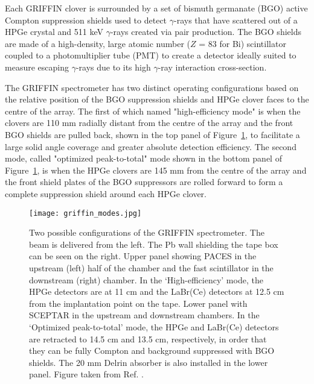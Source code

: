 \documentclass[cnatzke_thesis_proposal.tex]{subfiles}
\begin{document}
Each GRIFFIN clover is surrounded by a set of bismuth germanate (BGO) active Compton suppression shields used to detect $\gamma$-rays that have scattered out of a HPGe crystal and 511 keV $\gamma$-rays created via pair production. 
The BGO shields are made of a high-density, large atomic number ($Z$ = 83 for Bi) scintillator coupled to a photomultiplier tube (PMT) to create a detector ideally suited to measure escaping $\gamma$-rays due to its high $\gamma$-ray interaction cross-section. 

The GRIFFIN spectrometer has two distinct operating configurations based on the relative position of the BGO suppression shields and HPGe clover faces to the centre of the array. 
The first of which named "high-efficiency mode" is when the clovers are 110 mm radially distant from the centre of the array and the front BGO shields are pulled back, shown in the top panel of Figure~\ref{fig:griffin_modes}, to facilitate a large solid angle coverage and greater absolute detection efficiency. 
The second mode, called "optimized peak-to-total" mode shown in the bottom panel of Figure~\ref{fig:griffin_modes}, is when the HPGe clovers are 145 mm from the centre of the array and the front shield plates of the BGO suppressors are rolled forward to form a complete suppression shield around each HPGe clover. 

\begin{center}
  \begin{figure}[H]
    \begin{center}
      \texttt{[image: griffin\_modes.jpg]}
    \end{center}
    \caption{Two possible configurations of the GRIFFIN spectrometer. The beam is delivered from the left. The Pb wall shielding the tape box can be seen on the right. Upper panel showing PACES in the upstream (left) half of the chamber and the fast scintillator in the downstream (right) chamber. In the ‘High-efficiency’ mode, the HPGe detectors are at 11 cm and the LaBr(Ce) detectors at 12.5 cm from the implantation point on the tape. Lower panel with SCEPTAR in the upstream and downstream chambers. In the ‘Optimized peak-to-total’ mode, the HPGe and LaBr(Ce) detectors are retracted to 14.5 cm and 13.5 cm, respectively, in order that they can be fully Compton and background suppressed with BGO shields. The 20 mm Delrin absorber is also installed in the lower panel. Figure taken from Ref. \cite{garnsworthy_griffin_2019}.}
    \label{fig:griffin_modes}
  \end{figure}
\end{center}


\end{document}
